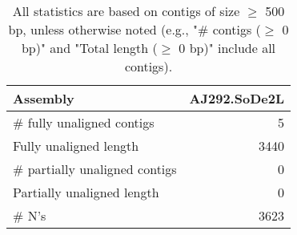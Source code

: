 \documentclass[12pt,a4paper]{article}
\begin{document}
\begin{table}[ht]
\begin{center}
\caption{All statistics are based on contigs of size $\geq$ 500 bp, unless otherwise noted (e.g., "\# contigs ($\geq$ 0 bp)" and "Total length ($\geq$ 0 bp)" include all contigs).}
\begin{tabular}{|l*{1}{|r}|}
\hline
Assembly & AJ292.SoDe2L \\ \hline
\# fully unaligned contigs & 5 \\ \hline
Fully unaligned length & 3440 \\ \hline
\# partially unaligned contigs & 0 \\ \hline
Partially unaligned length & 0 \\ \hline
\# N's & 3623 \\ \hline
\end{tabular}
\end{center}
\end{table}
\end{document}
